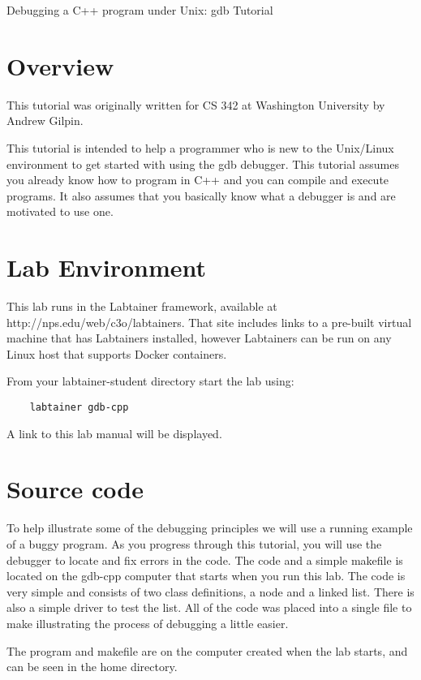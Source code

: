 


\begin{center}
{\LARGE Debugging a C++ program under Unix: gdb Tutorial}
\vspace{0.1in}\\
\end{center}

\section{Overview}
This tutorial was originally written for CS 342 at Washington University by Andrew Gilpin.

This tutorial is intended to help a programmer who is new to the Unix/Linux environment to get started with using the gdb debugger. This tutorial assumes you already know how to program in C++ and you can compile and execute programs. It also assumes that you basically know what a debugger is and are motivated to use one.

\section{Lab Environment}
\label{environment}
This lab runs in the Labtainer framework,
available at http://nps.edu/web/c3o/labtainers.
That site includes links to a pre-built virtual machine
that has Labtainers installed, however Labtainers can
be run on any Linux host that supports Docker containers.

From your labtainer-student directory start the lab using:
\begin{verbatim}
    labtainer gdb-cpp
\end{verbatim}
\noindent A link to this lab manual will be displayed.  
\section{Source code}
To help illustrate some of the debugging principles we will use a running example of a buggy program. As you progress through this tutorial, you will use the debugger to locate and fix errors in the code. The code and a simple makefile is located on the gdb-cpp computer that starts when you run this lab.
The code is very simple and consists of two class definitions, a node and a linked list. There is also a simple driver to test the list. All of the code was placed into a single file to make illustrating the process of debugging a little easier.

The program and makefile are on the computer created when the lab starts, and can be seen in the home directory.

